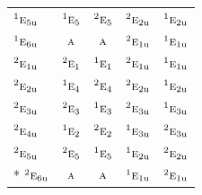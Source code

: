\documentclass[10pt,a4paper]{article}
\numberwithin{equation}{section}
\newcommand{\irr}[1]{\text{\normalfont\scshape #1}}
\newcommand{\conjpair}[1]{{}^{#1}}
\newcommand{\ptag}[1]{\mathrm{#1}}
\begin{document}
{\begin{longtable}{@{}lcccc@{}}
$\conjpair{1}\irr{e}_{5\ptag{u}}$ & $\conjpair{1}\irr{e}_{5}$ & $\conjpair{2}\irr{e}_{5}$ & $\conjpair{2}\irr{e}_{2\ptag{u}}$ & $\conjpair{1}\irr{e}_{2\ptag{u}}$\\
$\conjpair{1}\irr{e}_{6\ptag{u}}$ & $\irr{a}$ & $\irr{a}$ & $\conjpair{2}\irr{e}_{1\ptag{u}}$ & $\conjpair{1}\irr{e}_{1\ptag{u}}$\\
$\conjpair{2}\irr{e}_{1\ptag{u}}$ & $\conjpair{2}\irr{e}_{1}$ & $\conjpair{1}\irr{e}_{1}$ & $\conjpair{2}\irr{e}_{1\ptag{u}}$ & $\conjpair{1}\irr{e}_{1\ptag{u}}$\\
$\conjpair{2}\irr{e}_{2\ptag{u}}$ & $\conjpair{1}\irr{e}_{4}$ & $\conjpair{2}\irr{e}_{4}$ & $\conjpair{2}\irr{e}_{2\ptag{u}}$ & $\conjpair{1}\irr{e}_{2\ptag{u}}$\\
$\conjpair{2}\irr{e}_{3\ptag{u}}$ & $\conjpair{2}\irr{e}_{3}$ & $\conjpair{1}\irr{e}_{3}$ & $\conjpair{2}\irr{e}_{3\ptag{u}}$ & $\conjpair{1}\irr{e}_{3\ptag{u}}$\\
$\conjpair{2}\irr{e}_{4\ptag{u}}$ & $\conjpair{1}\irr{e}_{2}$ & $\conjpair{2}\irr{e}_{2}$ & $\conjpair{1}\irr{e}_{3\ptag{u}}$ & $\conjpair{2}\irr{e}_{3\ptag{u}}$\\
$\conjpair{2}\irr{e}_{5\ptag{u}}$ & $\conjpair{2}\irr{e}_{5}$ & $\conjpair{1}\irr{e}_{5}$ & $\conjpair{1}\irr{e}_{2\ptag{u}}$ & $\conjpair{2}\irr{e}_{2\ptag{u}}$\\*
$\conjpair{2}\irr{e}_{6\ptag{u}}$ & $\irr{a}$ & $\irr{a}$ & $\conjpair{1}\irr{e}_{1\ptag{u}}$ & $\conjpair{2}\irr{e}_{1\ptag{u}}$\\
\bottomrule\end{longtable}}
\end{document}
